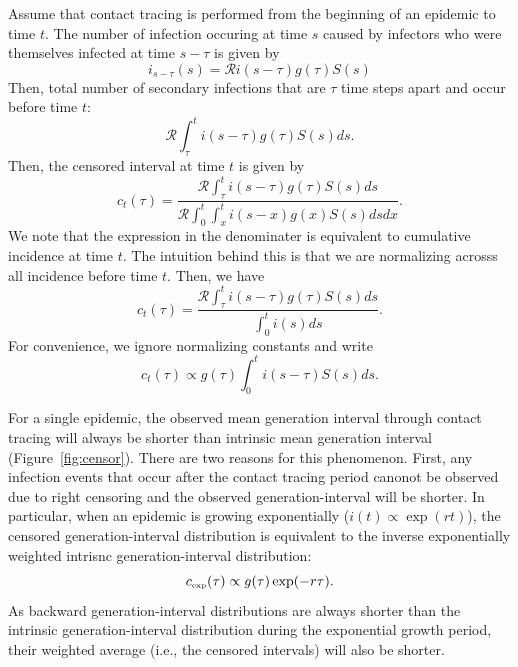 \documentclass{article}
\newcommand{\RR}{\ensuremath{{\mathcal R}}}
\newcommand{\tsub}[2]{#1_{{\textrm{\tiny #2}}}}
\begin{document}
Assume that contact tracing is performed from the beginning of an epidemic to time $t$.
The number of infection occuring at time $s$ caused by infectors who were themselves infected at time $s-\tau$ is given by
\begin{equation}
i_{s-\tau}(s) = \RR i(s-\tau) g(\tau) S(s)
\end{equation}
Then, total number of secondary infections that are $\tau$ time steps apart and occur before time $t$:
\begin{equation}
\RR \int_\tau^t i(s-\tau) g(\tau) S(s) ds.
\end{equation}
Then, the censored interval at time $t$ is given by
\begin{equation}
c_t(\tau)= \frac{\RR \int_\tau^t i(s-\tau) g(\tau) S(s) ds}{\RR \int_0^t \int_x^t i(s-x) g(x) S(s) ds dx}.
\end{equation}
We note that the expression in the denominater is equivalent to cumulative incidence at time $t$.
The intuition behind this is that we are normalizing acrosss all incidence before time $t$.
Then, we have
\begin{equation}
c_t(\tau) = \frac{\RR \int_\tau^t i(s-\tau) g(\tau) S(s) ds}{\int_0^t i(s) ds}.
\end{equation}
For convenience, we ignore normalizing constants and write
\begin{equation}\label{eq:obsg}
c_t(\tau) \propto g(\tau) \int_{0}^t i(s-\tau) S(s) ds.
\end{equation}

For a single epidemic, the observed mean generation interval through contact tracing will always be shorter than intrinsic mean generation interval (Figure~\ref{fig:censor}).
There are two reasons for this phenomenon.
First, any infection events that occur after the contact tracing period canonot be observed due to right censoring and the observed generation-interval will be shorter.
In particular, when an epidemic is growing exponentially ($i(t) \propto \exp(rt)$), 
the censored generation-interval distribution is equivalent to the inverse exponentially weighted intrisnc generation-interval distribution:
\begin{equation}
\tsub{c}{exp}(\tau) \propto g(\tau) \exp(-r\tau).
\end{equation}
As backward generation-interval distributions are always shorter than the intrinsic generation-interval distribution during the exponential growth period, their weighted average (i.e., the censored intervals) will also be shorter.
\end{document}
